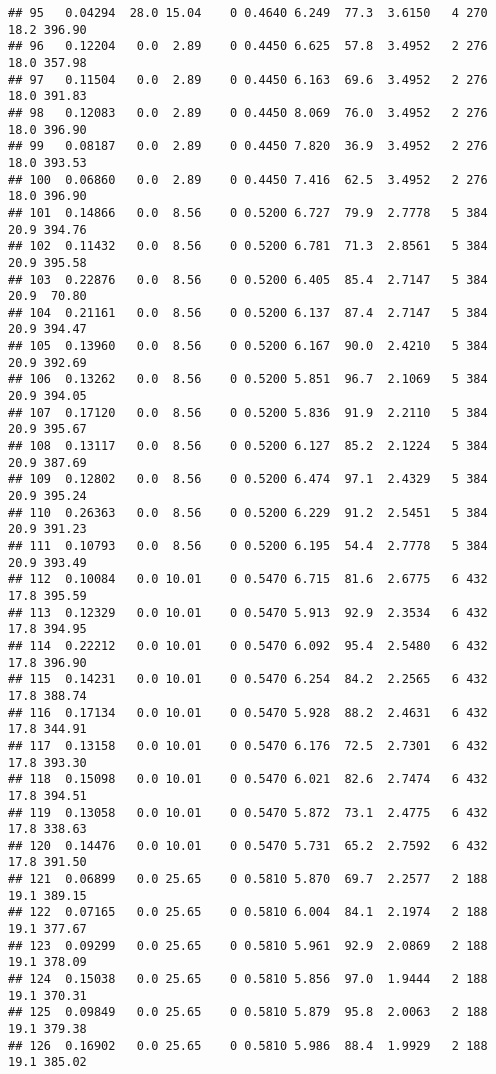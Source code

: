 \documentclass[
]{article}
\begin{document}
\begin{verbatim}
## 95   0.04294  28.0 15.04    0 0.4640 6.249  77.3  3.6150   4 270    18.2 396.90
## 96   0.12204   0.0  2.89    0 0.4450 6.625  57.8  3.4952   2 276    18.0 357.98
## 97   0.11504   0.0  2.89    0 0.4450 6.163  69.6  3.4952   2 276    18.0 391.83
## 98   0.12083   0.0  2.89    0 0.4450 8.069  76.0  3.4952   2 276    18.0 396.90
## 99   0.08187   0.0  2.89    0 0.4450 7.820  36.9  3.4952   2 276    18.0 393.53
## 100  0.06860   0.0  2.89    0 0.4450 7.416  62.5  3.4952   2 276    18.0 396.90
## 101  0.14866   0.0  8.56    0 0.5200 6.727  79.9  2.7778   5 384    20.9 394.76
## 102  0.11432   0.0  8.56    0 0.5200 6.781  71.3  2.8561   5 384    20.9 395.58
## 103  0.22876   0.0  8.56    0 0.5200 6.405  85.4  2.7147   5 384    20.9  70.80
## 104  0.21161   0.0  8.56    0 0.5200 6.137  87.4  2.7147   5 384    20.9 394.47
## 105  0.13960   0.0  8.56    0 0.5200 6.167  90.0  2.4210   5 384    20.9 392.69
## 106  0.13262   0.0  8.56    0 0.5200 5.851  96.7  2.1069   5 384    20.9 394.05
## 107  0.17120   0.0  8.56    0 0.5200 5.836  91.9  2.2110   5 384    20.9 395.67
## 108  0.13117   0.0  8.56    0 0.5200 6.127  85.2  2.1224   5 384    20.9 387.69
## 109  0.12802   0.0  8.56    0 0.5200 6.474  97.1  2.4329   5 384    20.9 395.24
## 110  0.26363   0.0  8.56    0 0.5200 6.229  91.2  2.5451   5 384    20.9 391.23
## 111  0.10793   0.0  8.56    0 0.5200 6.195  54.4  2.7778   5 384    20.9 393.49
## 112  0.10084   0.0 10.01    0 0.5470 6.715  81.6  2.6775   6 432    17.8 395.59
## 113  0.12329   0.0 10.01    0 0.5470 5.913  92.9  2.3534   6 432    17.8 394.95
## 114  0.22212   0.0 10.01    0 0.5470 6.092  95.4  2.5480   6 432    17.8 396.90
## 115  0.14231   0.0 10.01    0 0.5470 6.254  84.2  2.2565   6 432    17.8 388.74
## 116  0.17134   0.0 10.01    0 0.5470 5.928  88.2  2.4631   6 432    17.8 344.91
## 117  0.13158   0.0 10.01    0 0.5470 6.176  72.5  2.7301   6 432    17.8 393.30
## 118  0.15098   0.0 10.01    0 0.5470 6.021  82.6  2.7474   6 432    17.8 394.51
## 119  0.13058   0.0 10.01    0 0.5470 5.872  73.1  2.4775   6 432    17.8 338.63
## 120  0.14476   0.0 10.01    0 0.5470 5.731  65.2  2.7592   6 432    17.8 391.50
## 121  0.06899   0.0 25.65    0 0.5810 5.870  69.7  2.2577   2 188    19.1 389.15
## 122  0.07165   0.0 25.65    0 0.5810 6.004  84.1  2.1974   2 188    19.1 377.67
## 123  0.09299   0.0 25.65    0 0.5810 5.961  92.9  2.0869   2 188    19.1 378.09
## 124  0.15038   0.0 25.65    0 0.5810 5.856  97.0  1.9444   2 188    19.1 370.31
## 125  0.09849   0.0 25.65    0 0.5810 5.879  95.8  2.0063   2 188    19.1 379.38
## 126  0.16902   0.0 25.65    0 0.5810 5.986  88.4  1.9929   2 188    19.1 385.02

\end{verbatim}
\end{document}
